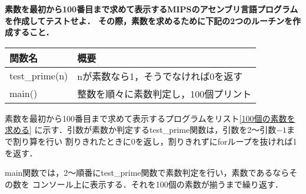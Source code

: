 \documentclass[11pt]{jarticle}
\begin{document}
\textbf{素数を最初から100番目まで求めて表示するMIPSのアセンブリ言語プログラムを作成してテストせよ． その際，素数を求めるために下記の2つのルーチンを作成すること．}\\

\begin{table}[h]
  \begin{tabular}{l|l}
    関数名 & 概要 \\ \hline
    test\_prime(n) & nが素数なら1，そうでなければ0を返す \\
    main() & 整数を順々に素数判定し，100個プリント
  \end{tabular}
\end{table}

素数を最初から100番目まで求めて表示するプログラムをリスト\ref{100個の素数を求める}
に示す．引数が素数か判定するtest\_prime関数は，引数を2～引数$-1$まで割り算を行い
割りきれたときに0を返し，割りきれずにforループを抜ければ1を返す．

main関数では，2～順番にtest\_prime関数で素数判定を行い，素数であるならその数を
コンソール上に表示する．それを100個の素数が揃うまで繰り返す．
\end{document}
